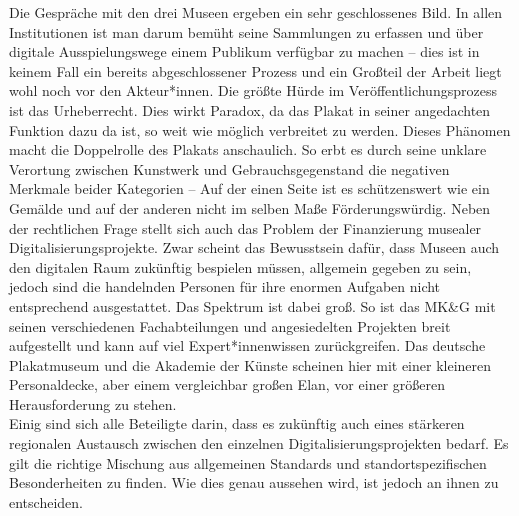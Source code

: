 \documentclass[a4paper,12pt,ngerman]{article}
\begin{document}
Die Gespräche mit den drei Museen ergeben ein sehr geschlossenes Bild. In allen Institutionen ist man darum bemüht seine Sammlungen zu erfassen und über digitale Ausspielungswege einem Publikum verfügbar zu machen – dies ist in keinem Fall ein bereits abgeschlossener Prozess und ein Großteil der Arbeit liegt wohl noch vor den Akteur*innen. Die größte Hürde im Veröffentlichungsprozess ist das Urheberrecht. Dies wirkt Paradox, da das Plakat in seiner angedachten Funktion dazu da ist, so weit wie möglich verbreitet zu werden. Dieses Phänomen macht die Doppelrolle des Plakats anschaulich. So erbt es durch seine unklare Verortung zwischen Kunstwerk und Gebrauchsgegenstand die negativen Merkmale beider Kategorien – Auf der einen Seite ist es schützenswert wie ein Gemälde und auf der anderen nicht im selben Maße Förderungswürdig. Neben der rechtlichen Frage stellt sich auch das Problem der Finanzierung musealer Digitalisierungsprojekte. Zwar scheint das Bewusstsein dafür, dass Museen auch den digitalen Raum zukünftig bespielen müssen, allgemein gegeben zu sein, jedoch sind die handelnden Personen für ihre enormen Aufgaben nicht entsprechend ausgestattet. Das Spektrum ist dabei groß. So ist das MK\&G mit seinen verschiedenen Fachabteilungen und angesiedelten Projekten breit aufgestellt und kann auf viel Expert*innenwissen zurückgreifen. Das deutsche Plakatmuseum und die Akademie der Künste scheinen hier mit einer kleineren Personaldecke, aber einem vergleichbar großen Elan, vor einer größeren Herausforderung zu stehen. \\
Einig sind sich alle Beteiligte darin, dass es zukünftig auch eines stärkeren regionalen Austausch zwischen den einzelnen Digitalisierungsprojekten bedarf. Es gilt die richtige Mischung aus allgemeinen Standards und standortspezifischen Besonderheiten zu finden. Wie dies genau aussehen wird, ist jedoch an ihnen zu entscheiden. \\
\end{document}
